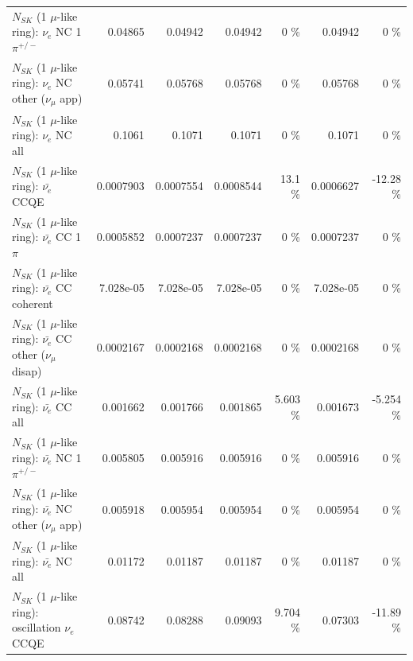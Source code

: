 \begin{table}
\begin{tabular}{| l | r | r | r  r | r  r |}
\hline
                           $N_{SK}$ (1 $\mu$-like ring): $\nu_e$ NC 1$\pi^{+/-}$ &         0.04865 &         0.04942 &         0.04942 &        0 \%  &         0.04942 &        0 \%  \\ 
                  $N_{SK}$ (1 $\mu$-like ring): $\nu_e$ NC other ($\nu_\mu$ app) &         0.05741 &         0.05768 &         0.05768 &        0 \%  &         0.05768 &        0 \%  \\ 
                                  $N_{SK}$ (1 $\mu$-like ring): $\nu_{e}$ NC all &          0.1061 &          0.1071 &          0.1071 &        0 \%  &          0.1071 &        0 \%  \\ 
\hline
\hline
\hline
                                $N_{SK}$ (1 $\mu$-like ring): $\bar{\nu_e}$ CCQE &       0.0007903 &       0.0007554 &       0.0008544 &     13.1 \%  &       0.0006627 &   -12.28 \%  \\ 
                           $N_{SK}$ (1 $\mu$-like ring): $\bar{\nu_e}$ CC 1$\pi$ &       0.0005852 &       0.0007237 &       0.0007237 &        0 \%  &       0.0007237 &        0 \%  \\ 
                         $N_{SK}$ (1 $\mu$-like ring): $\bar{\nu_e}$ CC coherent &       7.028e-05 &       7.028e-05 &       7.028e-05 &        0 \%  &       7.028e-05 &        0 \%  \\ 
          $N_{SK}$ (1 $\mu$-like ring): $\bar{\nu_e}$ CC other ($\nu_\mu$ disap) &       0.0002167 &       0.0002168 &       0.0002168 &        0 \%  &       0.0002168 &        0 \%  \\ 
                            $N_{SK}$ (1 $\mu$-like ring): $\bar{\nu_{e}}$ CC all &        0.001662 &        0.001766 &        0.001865 &    5.603 \%  &        0.001673 &   -5.254 \%  \\ 
\hline
                     $N_{SK}$ (1 $\mu$-like ring): $\bar{\nu_e}$ NC 1$\pi^{+/-}$ &        0.005805 &        0.005916 &        0.005916 &        0 \%  &        0.005916 &        0 \%  \\ 
            $N_{SK}$ (1 $\mu$-like ring): $\bar{\nu_e}$ NC other ($\nu_\mu$ app) &        0.005918 &        0.005954 &        0.005954 &        0 \%  &        0.005954 &        0 \%  \\ 
                            $N_{SK}$ (1 $\mu$-like ring): $\bar{\nu_{e}}$ NC all &         0.01172 &         0.01187 &         0.01187 &        0 \%  &         0.01187 &        0 \%  \\ 
\hline
\hline
\hline
                          $N_{SK}$ (1 $\mu$-like ring): oscillation $\nu_e$ CCQE &         0.08742 &         0.08288 &         0.09093 &    9.704 \%  &         0.07303 &   -11.89 \%  \\ 

\end{tabular}
\end{table}
